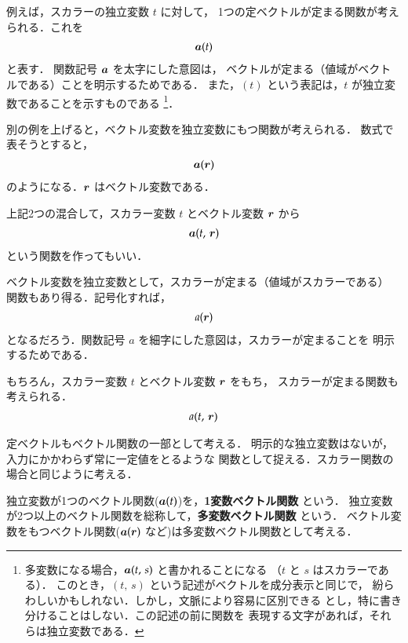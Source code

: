     例えば，スカラーの独立変数 $t$ に対して，
    1つの定ベクトルが定まる関数が考えられる．これを
        \begin{align}
            \boldsymbol{a} (t)
        \end{align}
    と表す．
    関数記号 $\boldsymbol{a}$ を太字にした意図は，
    ベクトルが定まる（値域がベクトルである）ことを明示するためである．
    また，$(t)$ という表記は，$t$ が独立変数であることを示すものである
        \footnote{
            多変数になる場合，$\boldsymbol{a}(t,\,s)$ と書かれることになる
            （$t$ と $s$ はスカラーである）．
            このとき，$(t,\,s)$ という記述がベクトルを成分表示と同じで，
            紛らわしいかもしれない．しかし，文脈により容易に区別できる
            とし，特に書き分けることはしない．この記述の前に関数を
            表現する文字があれば，それらは独立変数である．
        }．

    別の例を上げると，ベクトル変数を独立変数にもつ関数が考えられる．
    数式で表そうとすると，
        \begin{align}
            \boldsymbol{a} (\boldsymbol{r})
        \end{align}
    のようになる．$\boldsymbol{r}$ はベクトル変数である．

    上記2つの混合して，スカラー変数 $t$ とベクトル変数 $\boldsymbol{r}$ から
        \begin{align}
            \boldsymbol{a} (t,\,\boldsymbol{r})
        \end{align}
    という関数を作ってもいい．

    ベクトル変数を独立変数として，スカラーが定まる（値域がスカラーである）
    関数もあり得る．記号化すれば，
        \begin{align}
            a (\boldsymbol{r})
        \end{align}
    となるだろう．関数記号 $a$ を細字にした意図は，スカラーが定まることを
    明示するためである．

    もちろん，スカラー変数 $t$ とベクトル変数 $\boldsymbol{r}$ をもち，
    スカラーが定まる関数も考えられる．
        \begin{align}
            a (t,\,\boldsymbol{r})
        \end{align}

    定ベクトルもベクトル関数の一部として考える．
    明示的な独立変数はないが，入力にかかわらず常に一定値をとるような
    関数として捉える．スカラー関数の場合と同じように考える．

    独立変数が1つのベクトル関数($\boldsymbol{a}(t)$)を，\textbf{1変数ベクトル関数} という．
    独立変数が2つ以上のベクトル関数を総称して，\textbf{多変数ベクトル関数} という．
    ベクトル変数をもつベクトル関数($\boldsymbol{a}(\boldsymbol{r})$ など)は多変数ベクトル関数として考える．

